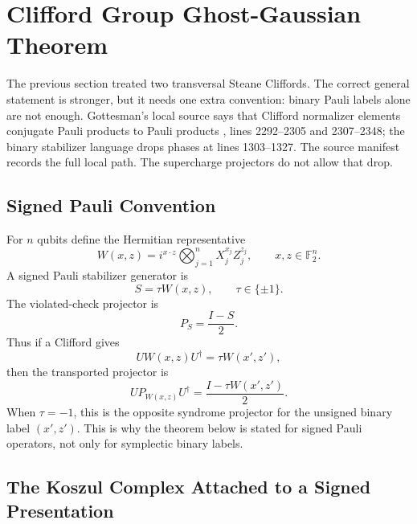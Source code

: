 
\section{Clifford Group Ghost-Gaussian Theorem}
\label{sec:clifford-group-ghost-gaussian-theorem}

The previous section treated two transversal Steane Cliffords.  The correct
general statement is stronger, but it needs one extra convention: binary Pauli
labels alone are not enough.  Gottesman's local source says that Clifford
normalizer elements conjugate Pauli products to Pauli products
, lines 2292--2305 and 2307--2348; the binary stabilizer
language drops phases at lines 1303--1327.  The source manifest records the
full local path.  The supercharge projectors do not allow that drop.

\subsection{Signed Pauli Convention}

For \(n\) qubits define the Hermitian representative
\[
  W(x,z)=i^{x\cdot z}\bigotimes_{j=1}^n X_j^{x_j}Z_j^{z_j},
  \qquad x,z\in\mathbb F_2^n .
\]
A signed Pauli stabilizer generator is
\[
  S=\tau W(x,z),\qquad \tau\in\{\pm1\}.
\]
The violated-check projector is
\[
  P_S=\frac{I-S}{2}.
\]
Thus if a Clifford gives
\[
  U W(x,z)U^\dagger=\tau W(x',z'),
\]
then the transported projector is
\[
  U P_{W(x,z)}U^\dagger=\frac{I-\tau W(x',z')}{2}.
\]
When \(\tau=-1\), this is the opposite syndrome projector for the unsigned
binary label \((x',z')\).  This is why the theorem below is stated for signed
Pauli operators, not only for symplectic binary labels.

\subsection{The Koszul Complex Attached to a Signed Presentation}

